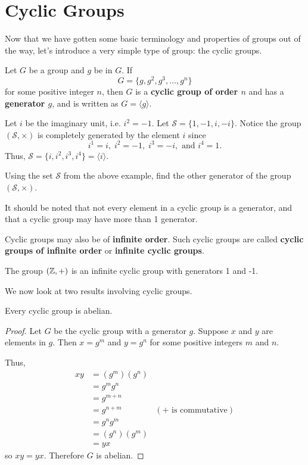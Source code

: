 \section{Cyclic Groups}
Now that we have gotten some basic terminology and properties of groups out of the way, let's introduce a very simple type of group: the cyclic groups.

\begin{definition}
    Let $G$ be a group and $g$ be in $G$. If
    \[
        G = \{g, g^2, g^3, \dots, g^n\}
    \]
    for some positive integer $n$, then $G$ is a \textbf{cyclic group of order $n$} and has a \textbf{generator $g$}, and is written as $G = \langle g \rangle$.
\end{definition}

\begin{example}
    Let $i$ be the imaginary unit, i.e. $i^2 = -1$. Let $\mathcal{S} = \{1, -1, i, -i\}$. Notice the group $(\mathcal{S}, \times)$ is completely generated by the element $i$ since
    \[
    i^1 = i,\; i^2 = -1,\; i^3 = -i, \text{ and } i^4 = 1.
    \]
    Thus, $\mathcal{S} = \{i, i^2, i^3, i^4\} = \langle i \rangle$.
\end{example}

\begin{exercise}
    Using the set $\mathcal{S}$ from the above example, find the other generator of the group $(\mathcal{S}, \times)$.
\end{exercise}

It should be noted that not every element in a cyclic group is a generator, and that a cyclic group may have more than 1 generator.

Cyclic groups may also be of \textbf{infinite order}. Such cyclic groups are called \textbf{cyclic groups of infinite order} or \textbf{infinite cyclic groups}.
\begin{example}
    The group $(\mathbb{Z}, +)$ is an infinite cyclic group with generators 1 and -1.
\end{example}

We now look at two results involving cyclic groups.
\begin{proposition}\label{prop-cyclic-group-is-abelian}
    Every cyclic group is abelian.
\end{proposition}
\begin{proof}
    Let $G$ be the cyclic group with a generator $g$. Suppose $x$ and $y$ are elements in $g$. Then $x = g^m$ and $y = g^n$ for some positive integers $m$ and $n$.

    Thus,
    \begin{align*}
        xy &= (g^m)(g^n)\\
        &= g^mg^n\\
        &= g^{m+n}\\
        &= g^{n+m} & (\text{+ is commutative})\\
        &= g^ng^m\\
        &= (g^n)(g^m)\\
        &= yx
    \end{align*}
    so $xy = yx$. Therefore $G$ is abelian.
\end{proof}

